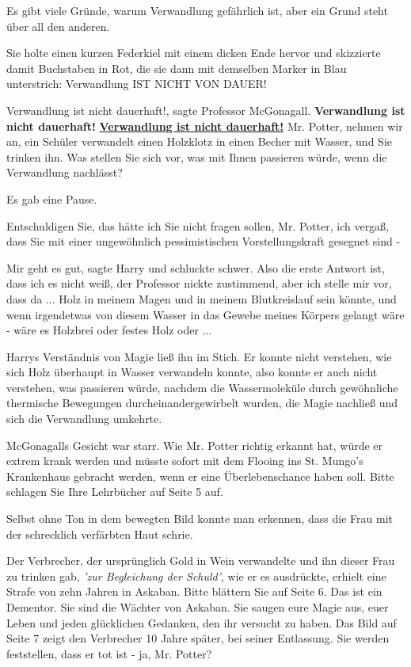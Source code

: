 \glqq{}Es gibt viele Gründe, warum Verwandlung gefährlich ist, aber ein Grund
steht über all den anderen.\grqq{}

Sie holte einen kurzen Federkiel mit einem dicken Ende hervor und skizzierte
damit Buchstaben in Rot, die sie dann mit demselben Marker in Blau unterstrich:
Verwandlung IST NICHT VON DAUER!

\glqq{}Verwandlung ist nicht dauerhaft!\grqq{}, sagte Professor McGonagall.
\glqq{}\textbf{Verwandlung ist nicht dauerhaft!} \textbf{\underline{Verwandlung
ist nicht dauerhaft!}} Mr. Potter, nehmen wir an, ein Schüler verwandelt einen
Holzklotz in einen Becher mit Wasser, und Sie trinken ihn. Was stellen Sie sich
vor, was mit Ihnen passieren würde, wenn die Verwandlung nachlässt?\grqq{}

Es gab eine Pause.

\glqq{}Entschuldigen Sie, das hätte ich Sie nicht fragen sollen, Mr. Potter, ich
vergaß, dass Sie mit einer ungewöhnlich pessimistischen Vorstellungskraft
gesegnet sind -\grqq{}

\glqq{}Mir geht es gut\grqq{}, sagte Harry und schluckte schwer. \glqq{}Also die
erste Antwort ist, dass ich es nicht weiß\grqq{}, der Professor nickte
zustimmend, \glqq{}aber ich stelle mir vor, dass da ... Holz in meinem Magen und
in meinem Blutkreislauf sein könnte, und wenn irgendetwas von diesem Wasser in
das Gewebe meines Körpers gelangt wäre - wäre es Holzbrei oder festes Holz
oder ...\grqq{}

Harrys Verständnis von Magie ließ ihn im Stich. Er konnte nicht verstehen, wie
sich Holz überhaupt in Wasser verwandeln konnte, also konnte er auch nicht
verstehen, was passieren würde, nachdem die Wassermoleküle durch gewöhnliche
thermische Bewegungen durcheinandergewirbelt wurden, die Magie nachließ und sich
die Verwandlung umkehrte.

McGonagalls Gesicht war starr. \glqq{}Wie Mr. Potter richtig erkannt hat, würde
er extrem krank werden und müsste sofort mit dem Flooing ins St. Mungo's
Krankenhaus gebracht werden, wenn er eine Überlebenschance haben soll. Bitte
schlagen Sie Ihre Lehrbücher auf Seite 5 auf.\grqq{}

Selbst ohne Ton in dem bewegten Bild konnte man erkennen, dass die Frau mit der
schrecklich verfärbten Haut schrie.

\glqq{}Der Verbrecher, der ursprünglich Gold in Wein verwandelte und ihn dieser
Frau zu trinken gab, \emph{'zur Begleichung der Schuld'}, wie er es ausdrückte,
erhielt eine Strafe von zehn Jahren in Askaban. Bitte blättern Sie auf Seite 6.
Das ist ein Dementor. Sie sind die Wächter von Askaban. Sie saugen eure Magie
aus, euer Leben und jeden glücklichen Gedanken, den ihr versucht zu haben. Das
Bild auf Seite 7 zeigt den Verbrecher 10 Jahre später, bei seiner Entlassung.
Sie werden feststellen, dass er tot ist - ja, Mr. Potter?\grqq{}

